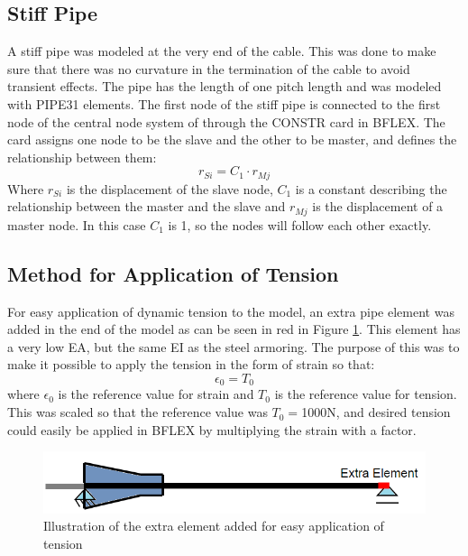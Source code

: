 \subsection{Stiff Pipe}
A stiff pipe was modeled at the very end of the cable. This was done to make sure that there was no curvature in the termination of the cable to avoid transient effects. The pipe has the length of one pitch length and was modeled with PIPE31 elements. The first node of the stiff pipe is connected to the first node of the central node system of through the CONSTR card in BFLEX. The card assigns one node to be the slave and the other to be master, and defines the relationship between them:
\begin{equation}
r_{Si}=C_1 \cdot r_{Mj}    
\end{equation}
Where $r_{Si}$ is the displacement of the slave node,  $C_1$ is a constant describing the relationship between the master and the slave and $r_{Mj}$ is the displacement of a master node.\newline 
\newline 
In this case $C_1$ is 1, so the nodes will follow each other exactly. 

\subsection{Method for Application of Tension}
\noindent For easy application of dynamic tension to the model, an extra pipe element was added in the end of the model as can be seen in red in Figure \ref{fig:exelem}. This element has a very low EA, but the same EI as the steel armoring. The purpose of this was to make it possible to apply the tension in the form of strain so that:
\begin{equation}
    \epsilon_0 = T_0
\end{equation}
where $\epsilon_0$ is the reference value for strain and $T_0$ is the reference value for tension. This was scaled so that the reference value was $T_0=$1000N, and desired tension could easily be applied in BFLEX by multiplying the strain with a factor. 
\begin{figure}[H]
\centering
\includegraphics[scale=0.8]{figures/exelem}
\caption[Illustration of the extra element added for easy application of tension]{Illustration of the extra element added for easy application of tension}
 \label{fig:exelem}
\end{figure}

